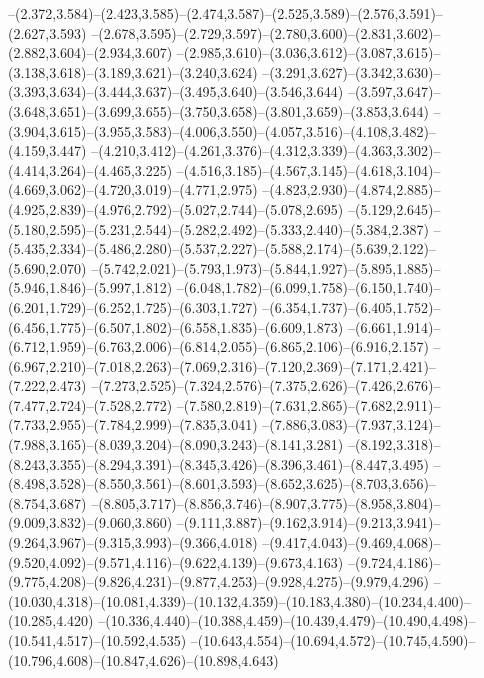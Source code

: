   --(2.372,3.584)--(2.423,3.585)--(2.474,3.587)--(2.525,3.589)--(2.576,3.591)--(2.627,3.593)%
  --(2.678,3.595)--(2.729,3.597)--(2.780,3.600)--(2.831,3.602)--(2.882,3.604)--(2.934,3.607)%
  --(2.985,3.610)--(3.036,3.612)--(3.087,3.615)--(3.138,3.618)--(3.189,3.621)--(3.240,3.624)%
  --(3.291,3.627)--(3.342,3.630)--(3.393,3.634)--(3.444,3.637)--(3.495,3.640)--(3.546,3.644)%
  --(3.597,3.647)--(3.648,3.651)--(3.699,3.655)--(3.750,3.658)--(3.801,3.659)--(3.853,3.644)%
  --(3.904,3.615)--(3.955,3.583)--(4.006,3.550)--(4.057,3.516)--(4.108,3.482)--(4.159,3.447)%
  --(4.210,3.412)--(4.261,3.376)--(4.312,3.339)--(4.363,3.302)--(4.414,3.264)--(4.465,3.225)%
  --(4.516,3.185)--(4.567,3.145)--(4.618,3.104)--(4.669,3.062)--(4.720,3.019)--(4.771,2.975)%
  --(4.823,2.930)--(4.874,2.885)--(4.925,2.839)--(4.976,2.792)--(5.027,2.744)--(5.078,2.695)%
  --(5.129,2.645)--(5.180,2.595)--(5.231,2.544)--(5.282,2.492)--(5.333,2.440)--(5.384,2.387)%
  --(5.435,2.334)--(5.486,2.280)--(5.537,2.227)--(5.588,2.174)--(5.639,2.122)--(5.690,2.070)%
  --(5.742,2.021)--(5.793,1.973)--(5.844,1.927)--(5.895,1.885)--(5.946,1.846)--(5.997,1.812)%
  --(6.048,1.782)--(6.099,1.758)--(6.150,1.740)--(6.201,1.729)--(6.252,1.725)--(6.303,1.727)%
  --(6.354,1.737)--(6.405,1.752)--(6.456,1.775)--(6.507,1.802)--(6.558,1.835)--(6.609,1.873)%
  --(6.661,1.914)--(6.712,1.959)--(6.763,2.006)--(6.814,2.055)--(6.865,2.106)--(6.916,2.157)%
  --(6.967,2.210)--(7.018,2.263)--(7.069,2.316)--(7.120,2.369)--(7.171,2.421)--(7.222,2.473)%
  --(7.273,2.525)--(7.324,2.576)--(7.375,2.626)--(7.426,2.676)--(7.477,2.724)--(7.528,2.772)%
  --(7.580,2.819)--(7.631,2.865)--(7.682,2.911)--(7.733,2.955)--(7.784,2.999)--(7.835,3.041)%
  --(7.886,3.083)--(7.937,3.124)--(7.988,3.165)--(8.039,3.204)--(8.090,3.243)--(8.141,3.281)%
  --(8.192,3.318)--(8.243,3.355)--(8.294,3.391)--(8.345,3.426)--(8.396,3.461)--(8.447,3.495)%
  --(8.498,3.528)--(8.550,3.561)--(8.601,3.593)--(8.652,3.625)--(8.703,3.656)--(8.754,3.687)%
  --(8.805,3.717)--(8.856,3.746)--(8.907,3.775)--(8.958,3.804)--(9.009,3.832)--(9.060,3.860)%
  --(9.111,3.887)--(9.162,3.914)--(9.213,3.941)--(9.264,3.967)--(9.315,3.993)--(9.366,4.018)%
  --(9.417,4.043)--(9.469,4.068)--(9.520,4.092)--(9.571,4.116)--(9.622,4.139)--(9.673,4.163)%
  --(9.724,4.186)--(9.775,4.208)--(9.826,4.231)--(9.877,4.253)--(9.928,4.275)--(9.979,4.296)%
  --(10.030,4.318)--(10.081,4.339)--(10.132,4.359)--(10.183,4.380)--(10.234,4.400)--(10.285,4.420)%
  --(10.336,4.440)--(10.388,4.459)--(10.439,4.479)--(10.490,4.498)--(10.541,4.517)--(10.592,4.535)%
  --(10.643,4.554)--(10.694,4.572)--(10.745,4.590)--(10.796,4.608)--(10.847,4.626)--(10.898,4.643)%

